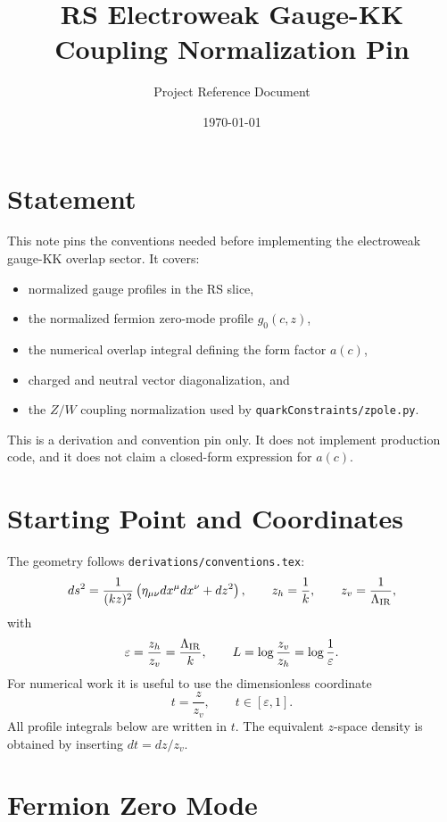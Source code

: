 \documentclass[11pt]{article}
\title{RS Electroweak Gauge-KK Coupling Normalization Pin}
\author{Project Reference Document}
\date{\today}
\begin{document}
\maketitle

\section{Statement}

This note pins the conventions needed before implementing the electroweak
gauge-KK overlap sector.  It covers:
\begin{itemize}
  \item normalized gauge profiles in the RS slice,
  \item the normalized fermion zero-mode profile \(g_0(c,z)\),
  \item the numerical overlap integral defining the form factor \(a(c)\),
  \item charged and neutral vector diagonalization, and
  \item the \(Z/W\) coupling normalization used by
        \texttt{quarkConstraints/zpole.py}.
\end{itemize}
This is a derivation and convention pin only.  It does not implement production
code, and it does not claim a closed-form expression for \(a(c)\).

\section{Starting Point and Coordinates}

The geometry follows \texttt{derivations/conventions.tex}:
\begin{equation}
  ds^2 = \frac{1}{(kz)^2}
  \left(\eta_{\mu\nu} dx^\mu dx^\nu + dz^2\right), \qquad
  z_h = \frac{1}{k}, \qquad z_v = \frac{1}{\Lambda_{\rm IR}},
\end{equation}
with
\begin{equation}
  \varepsilon = \frac{z_h}{z_v} = \frac{\Lambda_{\rm IR}}{k}, \qquad
  L = \log\frac{z_v}{z_h} = \log\frac{1}{\varepsilon}.
\end{equation}
For numerical work it is useful to use the dimensionless coordinate
\begin{equation}
  t = \frac{z}{z_v}, \qquad t\in[\varepsilon,1].
\end{equation}
All profile integrals below are written in \(t\).  The equivalent \(z\)-space
density is obtained by inserting \(dt=dz/z_v\).

\section{Fermion Zero Mode}
\end{document}
